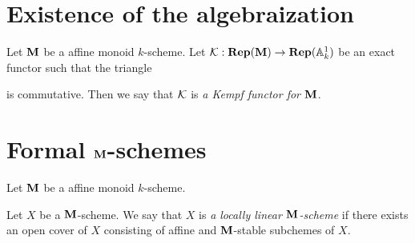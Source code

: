 \section{Existence of the algebraization}

\begin{definition}
Let $\mathbf{M}$ be a affine monoid $k$-scheme. Let ${\mathcal K}:\mathbf{Rep}(\mathbf{M})\rightarrow \mathbf{Rep}(\mathbb{A}^1_k)$ be an exact functor such that the triangle
\begin{center}
\end{center}
is commutative. Then we say that ${\mathcal K}$ is \textit{a Kempf functor for $\mathbf{M}$}.
\end{definition}

\section{Formal $\mathbf{M}$-schemes}
\noindent
Let $\mathbf{M}$ be a affine monoid $k$-scheme.

\begin{definition}
Let $X$ be a $\mathbf{M}$-scheme. We say that $X$ is \textit{a locally linear $\mathbf{M}$-scheme} if there exists an open cover of $X$ consisting of affine and $\mathbf{M}$-stable subchemes of $X$.
\end{definition}

